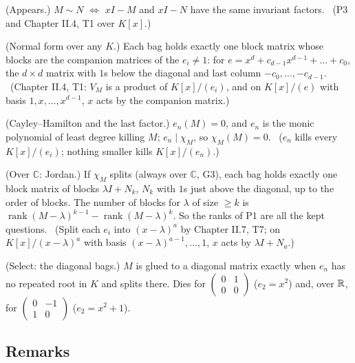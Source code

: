 \begin{lines}
\item[\lab{T1}] (Appears.) $M \sim N$ $\iff$ $xI - M$ and $xI - N$ have the same invariant factors. \ (P3 and Chapter II.4, T1 over $K[x]$.)
\item[\lab{T2}] (Normal form over any $K$.) Each bag holds exactly one block matrix whose blocks are the companion matrices of the $e_i \ne 1$: for $e = x^d + c_{d-1}x^{d-1} + \dots + c_0$, the $d \times d$ matrix with $1$s below the diagonal and last column $-c_0, \dots, -c_{d-1}$. \ (Chapter II.4, T1: $V_M$ is a product of $K[x]/(e_i)$, and on $K[x]/(e)$ with basis $1, x, \dots, x^{d-1}$, $x$ acts by the companion matrix.)
\item[\lab{T3}] (Cayley--Hamilton and the last factor.) $e_n(M) = 0$, and $e_n$ is the monic polynomial of least degree killing $M$; $e_n \mid \chi_M$, so $\chi_M(M) = 0$. \ ($e_n$ kills every $K[x]/(e_i)$; nothing smaller kills $K[x]/(e_n)$.)
\item[\lab{T4}] (Over $\mathbb{C}$: Jordan.) If $\chi_M$ splits (always over $\mathbb{C}$, G3), each bag holds exactly one block matrix of blocks $\lambda I + N_k$, $N_k$ with $1$s just above the diagonal, up to the order of blocks. The number of blocks for $\lambda$ of size $\ge k$ is $\operatorname{rank}(M - \lambda)^{k-1} - \operatorname{rank}(M - \lambda)^k$. So the ranks of P1 are all the kept questions. \ (Split each $e_i$ into $(x - \lambda)^a$ by Chapter II.7, T7; on $K[x]/(x - \lambda)^a$ with basis $(x - \lambda)^{a-1}, \dots, 1$, $x$ acts by $\lambda I + N_a$.)
\item[\lab{T5}] (Select: the diagonal bags.) $M$ is glued to a diagonal matrix exactly when $e_n$ has no repeated root in $K$ and splits there. Dies for $\begin{pmatrix} 0 & 1 \\ 0 & 0 \end{pmatrix}$ ($e_2 = x^2$) and, over $\mathbb{R}$, for $\begin{pmatrix} 0 & -1 \\ 1 & 0 \end{pmatrix}$ ($e_2 = x^2 + 1$).
\end{lines}

\subsection*{Remarks}

